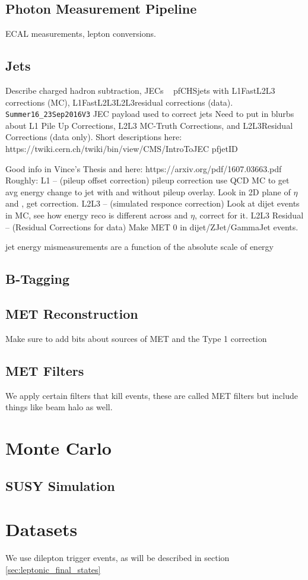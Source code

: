   \subsection{Photon Measurement Pipeline}
    ECAL measurements, lepton conversions.
  \subsection{Jets} \label{sec:jets}
    Describe charged hadron subtraction, JECs ~\cite{JERC}
    pfCHSjets with L1FastL2L3 corrections (MC), L1FastL2L3L2L3residual corrections (data).
    \verb=Summer16_23Sep2016V3= JEC payload used to correct jets
    Need to put in blurbs about L1 Pile Up Corrections, L2L3 MC-Truth Corrections, and L2L3Residual Corrections (data only). Short descriptions here: https://twiki.cern.ch/twiki/bin/view/CMS/IntroToJEC
    pfjetID


    Good info in Vince's Thesis and here: https://arxiv.org/pdf/1607.03663.pdf
    Roughly: L1 -- (pileup offset correction) pileup correction use QCD MC to get avg energy change to jet with and without pileup overlay. Look in 2D plane of $\eta$ and \pt, get correction.
    L2L3 -- (simulated responce correction) Look at dijet events in MC, see how energy reco is different across \pt and $\eta$, correct for it.
    L2L3 Residual -- (Residual Corrections for data) Make MET 0 in dijet/ZJet/GammaJet events.

    jet energy mismeasurements are a function of the absolute scale of energy
  \subsection{B-Tagging} \label{sec:b-tagging}

  \subsection{MET Reconstruction} \label{sec:MET_reco}
    Make sure to add bits about sources of MET and the Type 1 correction
  \subsection{MET Filters} \label{sec:met_filters} 
    We apply certain filters that kill events, these are called MET filters but include things like beam halo as well.

\section{Monte Carlo}
  \subsection{SUSY Simulation} \label{sec:susy_simulation}

\section{Datasets} \label{sec:datasets}
We use dilepton trigger events, as will be described in section \ref{sec:leptonic_final_states}